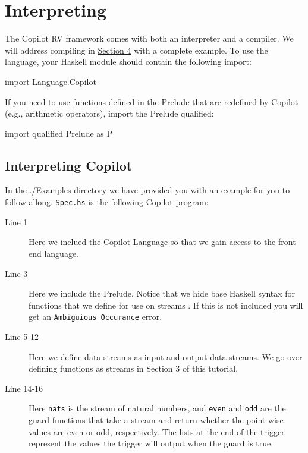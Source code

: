 \newpage 
\section{Interpreting}
\label{interpcompile}
The Copilot RV framework comes with both an interpreter and a
compiler. We will address compiling in \hyperref[sec:complete_example]{Section 4}
 with a complete example. 
\noindent To use the language, your Haskell module should contain the following import:
%
\begin{code}
import Language.Copilot
\end{code}
%
If you need to use functions defined in the Prelude that are redefined by
Copilot (e.g., arithmetic operators), import the Prelude qualified:
%
\begin{code}
import qualified Prelude as P
\end{code}

\subsection{Interpreting Copilot}
In the ./Examples directory we have provided you with an example
for you to follow allong. \texttt{Spec.hs} is the following Copilot program:
%


\begin{description}
  \item[Line 1] Here we inclued the Copilot Language so that we gain access to the
  front end language.
  \item[Line 3] Here we include the Prelude. Notice that we hide base Haskell
  syntax for functions that we define for use on streams . If this is not
  included you will get an \texttt{Ambiguious Occurance} error. 
  \item[Line 5-12] Here we define data streams as input and output data streams. We
  go over defining functions as streams in Section 3 of this tutorial. 
  \item[Line 14-16] Here {\tt nats} is the stream of natural numbers, and {\tt even} and {\tt odd}
  are the guard functions that take a stream and return whether the point-wise
  values are even or odd, respectively. The lists at the end of the trigger
  represent the values the trigger will output when the guard is true.

\end{description}

